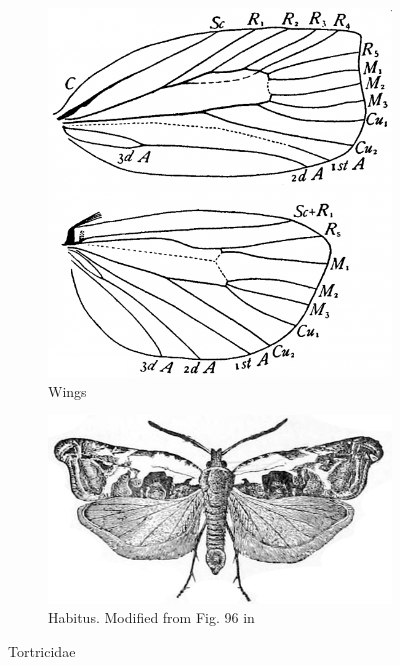 \documentclass[letterpaper, 11pt]{article}
\begin{document}
\begin{figure}[ht!]
    \centering
    \begin{subfigure}[ht!]{0.35\textwidth}
        \includegraphics[width=\textwidth]{TortricidWings}
        \caption{Wings \citep[Fig. 353]{comstock1918wings}}
        \label{fig:tortricid1}
    \end{subfigure}
    \qquad
    \begin{subfigure}[ht!]{0.55\textwidth}
        \includegraphics[width=\textwidth]{tortricidHab.png}
        \caption{Habitus. Modified from Fig. 96 in \cite{saunders1883insects}}
        \label{fig:tortricid2}
    \end{subfigure}
    \caption{Tortricidae}\label{fig:tortricids}
\end{figure}
\end{document}
